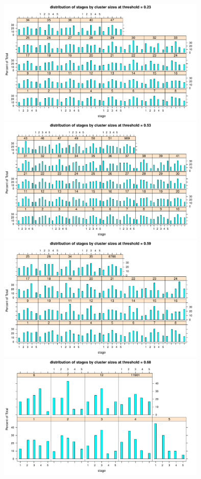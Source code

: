 \documentclass[]{revtex4}\usepackage[]{graphicx}\usepackage[]{color}
\newenvironment{knitrout}{}{} %
\begin{document}
\begin{enumerate}
\begin{knitrout}
{\centering \includegraphics[width=10cm]{figure/plotlattice-1} 
\includegraphics[width=10cm]{figure/plotlattice-2} 
\includegraphics[width=10cm]{figure/plotlattice-3} 
\includegraphics[width=10cm]{figure/plotlattice-4} 

}



\end{knitrout}


\end{enumerate}
\end{document}
